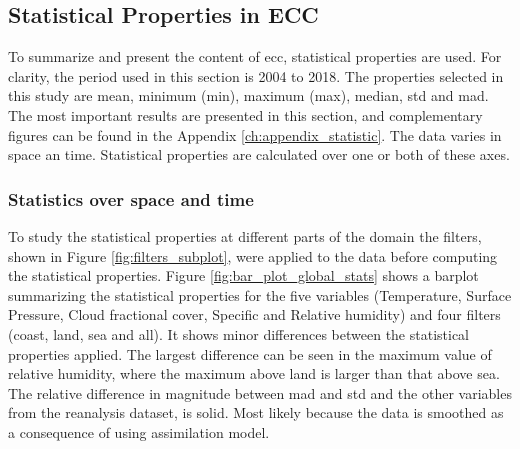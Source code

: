 \subsection{Statistical Properties in ECC}
To summarize and present the content of \acrshort{ecc}, statistical properties are used. For clarity, the period used in this section is 2004 to 2018. The properties selected in this study are mean, minimum (min), maximum (max), median, \acrfull{std} and \acrfull{mad}. The most important results are presented in this section, and complementary figures can be found in the Appendix \ref{ch:appendix_statistic}. 
The data varies in space an time. Statistical properties are calculated over one or both of these axes.

\subsubsection{Statistics over space and time} 
To study the statistical properties at different parts of the domain the filters, shown in Figure \ref{fig:filters_subplot}, were applied to the data before computing the statistical properties. Figure \ref{fig:bar_plot_global_stats} shows a barplot summarizing the statistical properties for the five variables (Temperature, Surface Pressure, Cloud fractional cover, Specific and Relative humidity) and four filters (coast, land, sea and all). It shows minor differences between the statistical properties applied. The largest difference can be seen in the maximum value of relative humidity, where the maximum above land is larger than that above sea. The relative difference in magnitude between \acrshort{mad} and \acrshort{std} and the other variables from the reanalysis dataset, is solid. Most likely because the data is smoothed as a consequence of using assimilation model. 
